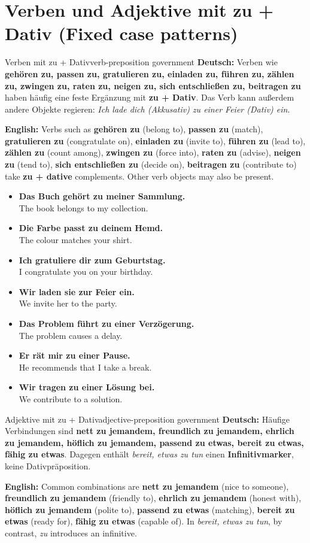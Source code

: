 \documentclass[a4paper,11pt]{article}
\newcommand{\GermanText}[1]{\textbf{Deutsch: }#1\par}
\newcommand{\EnglishText}[1]{{\small\color{SoftGray}\textbf{English: }#1\par}}
\newcommand{\ExampleItem}[2]{\item \textbf{#1}\\{\small\color{SoftGray}#2}}
\begin{document}
\section{Verben und Adjektive mit zu + Dativ (Fixed case patterns)}
\begin{grammarentry}{Verben mit zu + Dativ}{verb-preposition government}
\GermanText{Verben wie \textbf{gehören zu, passen zu, gratulieren zu, einladen zu, führen zu, zählen zu, zwingen zu, raten zu, neigen zu, sich entschließen zu, beitragen zu} haben häufig eine feste Ergänzung mit \textbf{zu + Dativ}. Das Verb kann außerdem andere Objekte regieren: \emph{Ich lade dich (Akkusativ) zu einer Feier (Dativ) ein}.}
\EnglishText{Verbs such as \textbf{gehören zu} (belong to), \textbf{passen zu} (match), \textbf{gratulieren zu} (congratulate on), \textbf{einladen zu} (invite to), \textbf{führen zu} (lead to), \textbf{zählen zu} (count among), \textbf{zwingen zu} (force into), \textbf{raten zu} (advise), \textbf{neigen zu} (tend to), \textbf{sich entschließen zu} (decide on), \textbf{beitragen zu} (contribute to) take \textbf{zu + dative} complements. Other verb objects may also be present.}
\end{grammarentry}
\begin{exbox}
\begin{itemize}
\ExampleItem{Das Buch gehört zu meiner Sammlung.}{The book belongs to my collection.}
\ExampleItem{Die Farbe passt zu deinem Hemd.}{The colour matches your shirt.}
\ExampleItem{Ich gratuliere dir zum Geburtstag.}{I congratulate you on your birthday.}
\ExampleItem{Wir laden sie zur Feier ein.}{We invite her to the party.}
\ExampleItem{Das Problem führt zu einer Verzögerung.}{The problem causes a delay.}
\ExampleItem{Er rät mir zu einer Pause.}{He recommends that I take a break.}
\ExampleItem{Wir tragen zu einer Lösung bei.}{We contribute to a solution.}
\end{itemize}
\end{exbox}
\begin{grammarentry}{Adjektive mit zu + Dativ}{adjective-preposition government}
\GermanText{Häufige Verbindungen sind \textbf{nett zu jemandem, freundlich zu jemandem, ehrlich zu jemandem, höflich zu jemandem, passend zu etwas, bereit zu etwas, fähig zu etwas}. Dagegen enthält \emph{bereit, etwas zu tun} einen \textbf{Infinitivmarker}, keine Dativpräposition.}
\EnglishText{Common combinations are \textbf{nett zu jemandem} (nice to someone), \textbf{freundlich zu jemandem} (friendly to), \textbf{ehrlich zu jemandem} (honest with), \textbf{höflich zu jemandem} (polite to), \textbf{passend zu etwas} (matching), \textbf{bereit zu etwas} (ready for), \textbf{fähig zu etwas} (capable of). In \emph{bereit, etwas zu tun}, by contrast, \emph{zu} introduces an infinitive.}
\end{grammarentry}
\end{document}
